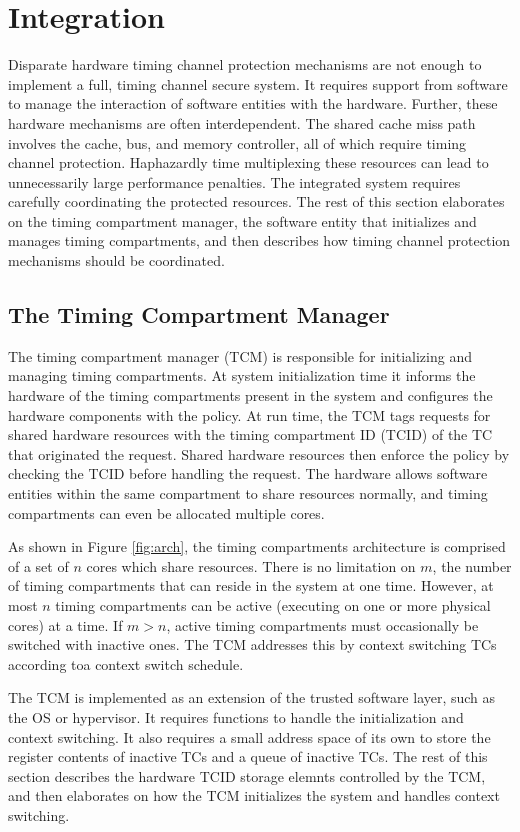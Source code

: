\section{Integration}
Disparate hardware timing channel protection mechanisms are not enough to 
implement a full, timing channel secure system. It requires support from 
software to manage the interaction of software entities with the hardware.  
Further, these hardware mechanisms are often interdependent. The shared cache 
miss path involves the cache, bus, and memory controller, all of which require 
timing channel protection. Haphazardly time multiplexing these resources can 
lead to unnecessarily large performance penalties. The integrated system 
requires carefully coordinating the protected resources. The rest of this 
section elaborates on the timing compartment manager, the software entity that 
initializes and manages timing compartments, and then describes how timing 
channel protection mechanisms should be coordinated.

\subsection{The Timing Compartment Manager}
\label{sec:integration_tcm}
The timing compartment manager (TCM) is responsible for initializing and 
managing timing compartments. At system initialization time it informs the 
hardware of the timing compartments present in the system and configures the 
hardware components with the policy. At run time, the TCM tags requests for 
shared hardware resources with the timing compartment ID (TCID) of the TC that 
originated the request. Shared hardware resources then enforce the policy by 
checking the TCID before handling the request. The hardware allows software 
entities within the same compartment to share resources normally, and timing 
compartments can even be allocated multiple cores.

As shown in Figure \ref{fig:arch}, the timing compartments architecture is 
comprised of a set of $n$ cores which share resources. There is no limitation 
on $m$, the number of timing compartments that can reside in the system at one 
time. However, at most $n$ timing compartments can be active (executing on one 
or more physical cores) at a time. If $m>n$, active timing compartments must 
occasionally be switched with inactive ones. The TCM addresses this by context 
switching TCs according toa context switch schedule.

The TCM is implemented as an extension of the trusted software layer, such as 
the OS or hypervisor. It requires functions to handle the initialization
and context switching. It also requires a small address space of its own to 
store the register contents of inactive TCs and a queue of inactive TCs.
The rest of this section describes the hardware TCID storage elemnts controlled 
by the TCM, and then elaborates on how the TCM initializes the system and 
handles context switching.

